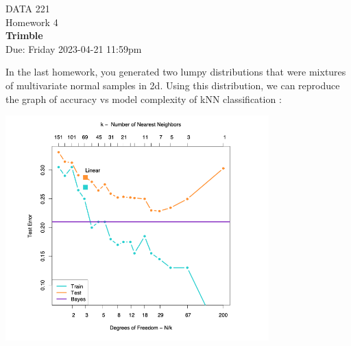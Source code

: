 \documentclass[12pt]{book}
\theoremstyle{definition}
\begin{document}
\begin{center}
{\Large DATA 221 \\  Homework 4  }\\
\textbf{Trimble  } \\ %
Due: Friday 2023-04-21  11:59pm
\end{center}

\vspace{0.2 cm}
In the last homework, you generated two lumpy distributions that were mixtures of multivariate normal samples in 2d.
Using this distribution, we can reproduce the graph of accuracy vs model complexity of kNN classification :

\includegraphics[width=4in]{src/hastie-generalization.png}
\end{document}
